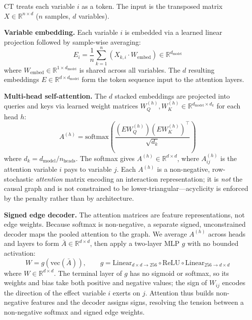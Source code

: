 \documentclass[12pt,a4paper]{article}
\begin{document}
CT treats each variable $i$ as a token. The input is the transposed matrix $X \in \mathbb{R}^{n \times d}$ ($n$ samples, $d$ variables).

\textbf{Variable embedding.} Each variable $i$ is embedded via a learned linear projection followed by sample-wise averaging:
\begin{equation}
    E_i = \frac{1}{n} \sum_{k=1}^{n} (X_{k,i} \cdot W_{\text{embed}}) \in \mathbb{R}^{d_{\text{model}}}
    \label{eq:embedding}
\end{equation}
where $W_{\text{embed}} \in \mathbb{R}^{1 \times d_{\text{model}}}$ is shared across all variables. The $d$ resulting embeddings $E \in \mathbb{R}^{d \times d_{\text{model}}}$ form the token sequence input to the attention layers.

\textbf{Multi-head self-attention.} The $d$ stacked embeddings are projected into queries and keys via learned weight matrices $W_Q^{(h)}, W_K^{(h)} \in \mathbb{R}^{d_{\text{model}} \times d_k}$ for each head $h$:
\begin{equation}
    A^{(h)} = \text{softmax}\left(\frac{(E W_Q^{(h)})(E W_K^{(h)})^\top}{\sqrt{d_k}}\right)
    \label{eq:per_head}
\end{equation}
where $d_k = d_{\text{model}} / n_{\text{heads}}$. The softmax gives $A^{(h)} \in \mathbb{R}^{d \times d}$, where $A_{ij}^{(h)}$ is the attention variable $i$ pays to variable $j$. Each $A^{(h)}$ is a non-negative, row-stochastic \emph{attention} matrix encoding an interaction representation; it is \emph{not} the causal graph and is not constrained to be lower-triangular---acyclicity is enforced by the penalty rather than by architecture.

\textbf{Signed edge decoder.} The attention matrices are feature representations, not edge weights. Because softmax is non-negative, a separate signed, unconstrained decoder maps the pooled attention to the graph. We average $A^{(h)}$ across heads and layers to form $\bar{A}\in\mathbb{R}^{d\times d}$, then apply a two-layer MLP $g$ with no bounded activation:
\begin{equation}
    W = g\left(\mathrm{vec}(\bar{A})\right), \qquad g = \mathrm{Linear}_{d \times d \to 256} \circ \mathrm{ReLU} \circ \mathrm{Linear}_{256 \to d \times d}
    \label{eq:signed_decoder}
\end{equation}
where $W\in\mathbb{R}^{d\times d}$. The terminal layer of $g$ has no sigmoid or softmax, so its weights and bias take both positive and negative values; the sign of $W_{ij}$ encodes the direction of the effect variable $i$ exerts on $j$. Attention thus builds non-negative features and the decoder assigns signs, resolving the tension between a non-negative softmax and signed edge weights.
\end{document}
